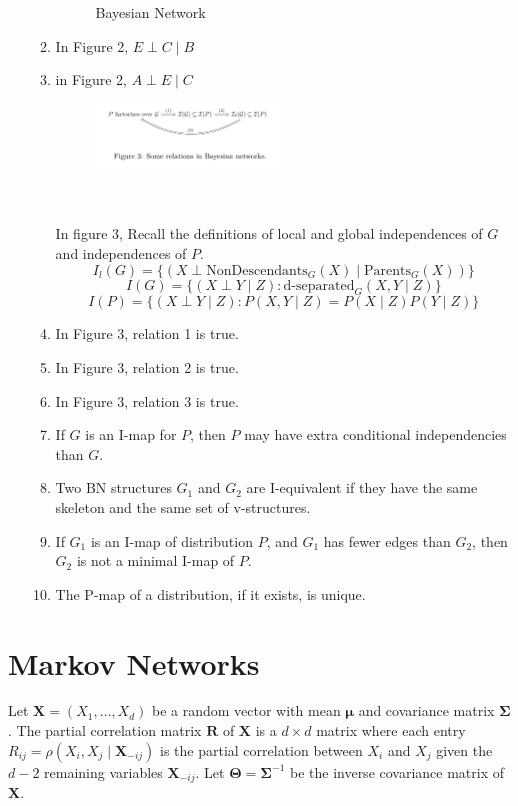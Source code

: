 \documentclass[a3paper,12pt]{extarticle} %
\begin{document}
\begin{enumerate}
\begin{enumerate}
\begin{figure}[h]
        \caption{Bayesian Network}
    \end{figure}
    \item In Figure 2, \(E \perp C \mid B\)
    \item in Figure 2, \(A \perp E \mid C\)
    \begin{figure}[h]
        \centering
        \includegraphics[width=0.5\textwidth]{bn3.png}
    \end{figure}
    \\\\ In figure 3, 
Recall the definitions of local and global independences of \( G \) and independences of \( P \).
\[
I_l(G) = \{(X \perp \text{NonDescendants}_G(X) \mid \text{Parents}_G(X))\} \tag{1}
\]
\[
I(G) = \{(X \perp Y \mid Z) : \text{d-separated}_G(X, Y \mid Z)\} \tag{2}
\]
\[
I(P) = \{(X \perp Y \mid Z) : P(X, Y \mid Z) = P(X \mid Z)P(Y \mid Z)\} \tag{3}
\]
\item In Figure 3, relation 1 is true.
\item In Figure 3, relation 2 is true.
\item In Figure 3, relation 3 is true.
\item If \( G \) is an I-map for \( P \), then \( P \) may have extra conditional independencies than \( G \).
\item Two BN structures \( G_1 \) and \( G_2 \) are I-equivalent if they have the same skeleton and the same set of v-structures.
\item If \( G_1 \) is an I-map of distribution \( P \), and \( G_1 \) has fewer edges than \( G_2 \), then \( G_2 \) is not a minimal I-map of \( P \).
\item The P-map of a distribution, if it exists, is unique.
\end{enumerate}
\end{enumerate}
\newpage
\section{Markov Networks}
Let \( \mathbf{X} = (X_1, \ldots, X_d) \) be a random vector with mean \( \boldsymbol{\mu} \) and covariance matrix \( \boldsymbol{\Sigma} \). The partial correlation matrix \( \mathbf{R} \) of \( \mathbf{X} \) is a \( d \times d \) matrix where each entry \( R_{ij} = \rho(X_i, X_j \mid \mathbf{X}_{-ij}) \) is the partial correlation between \( X_i \) and \( X_j \) given the \( d-2 \) remaining variables \( \mathbf{X}_{-ij} \). Let \( \boldsymbol{\Theta} = \boldsymbol{\Sigma}^{-1} \) be the inverse covariance matrix of \( \mathbf{X} \).
\end{document}
